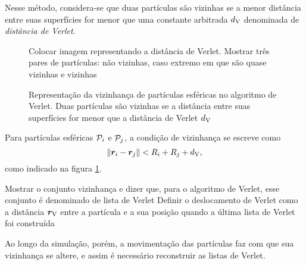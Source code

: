 Nesse método, considera-se que duas partículas são vizinhas se a menor distância entre suas superfícies for menor que uma constante arbitrada \(d_{\text{V}}\) denominada de \textit{distância de Verlet}.

\begin{figure}[h]
	\caption{Representação da vizinhança de partículas esféricas no algoritmo de Verlet. Duas partículas são vizinhas se a distância entre suas superfícies for menor que a distância de Verlet \(d_{\text{V}}\)}
	\begin{center}
		\alert{Colocar imagem representando a distância de Verlet. Mostrar três pares de partículas: não vizinhas, caso extremo em que são quase vizinhas e vizinhas}
	\end{center}
	\label{fig:verlet_distance}
\end{figure}

Para partículas esféricas \({\mathcal{P}}_{i}\) e \({\mathcal{P}}_{j}\), a condição de vizinhança se escreve como
\begin{equation*}
	\norm{{\bm{r}}_{i} - {\bm{r}}_{j}} < {R}_{i} + {R}_{j} + d_{\text{V}},
\end{equation*}
como indicado na figura \ref{fig:verlet_distance}. 

\alert{Mostrar o conjunto vizinhança e dizer que, para o algoritmo de Verlet, esse conjunto é denominado de lista de Verlet}
\alert{Definir o deslocamento de Verlet como a distância \(\bm{r}_{\text{V}}\) entre a partícula e a sua posição quando a última lista de Verlet foi construída}


Ao longo da simulação, porém, a movimentação das partículas faz com que sua vizinhança se altere, e assim é necessário reconstruir as listas de Verlet.

